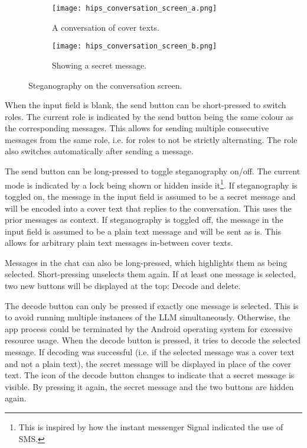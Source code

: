 \begin{figure}
    \captionsetup{width=\linewidth}
    \centering
    \begin{subfigure}{0.3\linewidth}
        \texttt{[image: hips\_conversation\_screen\_a.png]}
        \caption{A conversation of cover texts.}
        \label{fig:conversationScreenA}
    \end{subfigure}
    \hspace{1cm}
    \begin{subfigure}{0.3\linewidth}
        \texttt{[image: hips\_conversation\_screen\_b.png]}
        \caption{Showing a secret message.}
        \label{fig:conversationScreenB}
    \end{subfigure}
    \caption[HiPS: Conversation screen]{Steganography on the conversation screen.}
    \label{fig:conversationScreen}
\end{figure}

When the input field is blank, the send button can be short-pressed to switch roles. The current role is indicated by the send button being the same colour as the corresponding messages. This allows for sending multiple consecutive messages from the same role, i.e. for roles to not be strictly alternating. The role also switches automatically after sending a message.

The send button can be long-pressed to toggle steganography on/off. The current mode is indicated by a lock being shown or hidden inside it\footnote{This is inspired by how the instant messenger Signal indicated the use of \gls{SMS}.}. If steganography is toggled on, the message in the input field is assumed to be a secret message and will be encoded into a cover text that replies to the conversation. This uses the prior messages as context. If steganography is toggled off, the message in the input field is assumed to be a plain text message and will be sent as is. This allows for arbitrary plain text messages in-between cover texts.

Messages in the chat can also be long-pressed, which highlights them as being selected. Short-pressing unselects them again. If at least one message is selected, two new buttons will be displayed at the top: Decode and delete.

The decode button can only be pressed if exactly one message is selected. This is to avoid running multiple instances of the \gls{LLM} simultaneously. Otherwise, the app process could be terminated by the Android operating system for excessive resource usage. When the decode button is pressed, it tries to decode the selected message. If decoding was successful (i.e. if the selected message was a cover text and not a plain text), the secret message will be displayed in place of the cover text. The icon of the decode button changes to indicate that a secret message is visible. By pressing it again, the secret message and the two buttons are hidden again.

